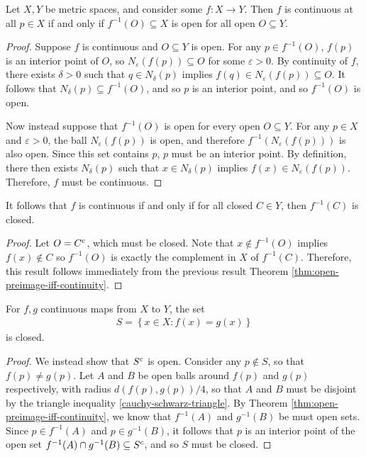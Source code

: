 \begin{thm}\label{thm:open-preimage-iff-continuity}
    Let $X, Y$ be metric spaces, and consider some $f: X \to Y$. Then $f$ is continuous at all $p \in X$ if and only if $f^{-1}(O) \subseteq X$ is open for all open $O \subseteq Y$.
\end{thm}

\begin{proof}
    Suppose $f$ is continuous and $O \subseteq Y$ is open. For any $p \in f^{-1}(O)$, $f(p)$ is an interior point of $O$, so $N_{\varepsilon}(f(p)) \subseteq O$ for some $\varepsilon > 0$. By continuity of $f$, there exists $\delta > 0$ such that $q \in N_{\delta}(p)$ implies $f(q) \in N_{\varepsilon}(f(p)) \subseteq O$. It follows that $N_{\delta}(p) \subseteq f^{-1}(O)$, and so $p$ is an interior point, and so $f^{-1}(O)$ is open.

    Now instead suppose that $f^{-1}(O)$ is open for every open $O \subseteq Y$. For any $p \in X$ and $\varepsilon > 0$, the ball $N_{\varepsilon}(f(p))$ is open, and therefore $f^{-1}(N_{\varepsilon}(f(p)))$ is also open. Since this set contains $p$, $p$ must be an interior point. By definition, there then exists $N_{\delta}(p)$ such that $x \in N_{\delta}(p)$ implies $f(x) \in N_{\varepsilon}(f(p))$. Therefore, $f$ must be continuous.
\end{proof}

\begin{cor}\label{cor:closed-preimage-iff-continuityd}
    It follows that $f$ is continuous if and only if for all closed $C \in Y$, then $f^{-1}(C)$ is closed.
\end{cor}

\begin{proof}
    Let $O = C^{c}$, which must be closed. Note that $x \not\in f^{-1}(O)$ implies $f(x) \not\in C$ so $f^{-1}(O)$ is exactly the complement in $X$ of $f^{-1}(C)$. Therefore, this result follows immediately from the previous result Theorem \ref{thm:open-preimage-iff-continuity}.
\end{proof}

\begin{cor}\label{cor:equal-subset-closed}
    For $f, g$ continuous maps from $X$ to $Y$, the set
    \begin{align}
        S = \left\{x \in X: f(x) = g(x)\right\}
    \end{align}
    is closed.
\end{cor}

\begin{proof}
    We instead show that $S^{c}$ is open. Consider any $p \not\in S$, so that $f(p) \neq g(p)$. Let $A$ and $B$ be open balls around $f(p)$ and $g(p)$ respectively, with radius $d(f(p), g(p))/4$, so that $A$ and $B$ must be disjoint by the triangle inequality \ref{cauchy-schwarz-triangle}. By Theorem \ref{thm:open-preimage-iff-continuity}, we know that $f^{-1}(A)$ and $g^{-1}(B)$ be must open sets. Since $p \in f^{-1}(A)$ and $p \in g^{-1}(B)$, it follows that $p$ is an interior point of the open set $f^{-1}(A) \cap g^{-1}(B) \subseteq S^{c}$, and so $S$ must be closed.
\end{proof}

